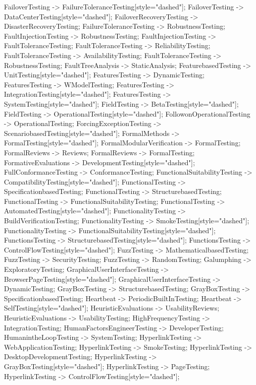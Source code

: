 \documentclass{article}
\begin{document}
{FailoverTesting -> FailureToleranceTesting[style="dashed"];
FailoverTesting -> DataCenterTesting[style="dashed"];
FailoverRecoveryTesting -> DisasterRecoveryTesting;
FailureToleranceTesting -> RobustnessTesting;
FaultInjectionTesting -> RobustnessTesting;
FaultInjectionTesting -> FaultToleranceTesting;
FaultToleranceTesting -> ReliabilityTesting;
FaultToleranceTesting -> AvailabilityTesting;
FaultToleranceTesting -> RobustnessTesting;
FaultTreeAnalysis -> StaticAnalysis;
FeaturebasedTesting -> UnitTesting[style="dashed"];
FeaturesTesting -> DynamicTesting;
FeaturesTesting -> WModelTesting;
FeaturesTesting -> IntegrationTesting[style="dashed"];
FeaturesTesting -> SystemTesting[style="dashed"];
FieldTesting -> BetaTesting[style="dashed"];
FieldTesting -> OperationalTesting[style="dashed"];
FollowonOperationalTesting -> OperationalTesting;
ForcingExceptionTesting -> ScenariobasedTesting[style="dashed"];
FormalMethods -> FormalTesting[style="dashed"];
FormalModularVerification -> FormalTesting;
FormalReviews -> Reviews;
FormalReviews -> FormalTesting;
FormativeEvaluations -> DevelopmentTesting[style="dashed"];
FullConformanceTesting -> ConformanceTesting;
FunctionalSuitabilityTesting -> CompatibilityTesting[style="dashed"];
FunctionalTesting -> SpecificationbasedTesting;
FunctionalTesting -> StructurebasedTesting;
FunctionalTesting -> FunctionalSuitabilityTesting;
FunctionalTesting -> AutomatedTesting[style="dashed"];
FunctionalityTesting -> BuildVerificationTesting;
FunctionalityTesting -> SmokeTesting[style="dashed"];
FunctionalityTesting -> FunctionalSuitabilityTesting[style="dashed"];
FunctionsTesting -> StructurebasedTesting[style="dashed"];
FunctionsTesting -> ControlFlowTesting[style="dashed"];
FuzzTesting -> MathematicalbasedTesting;
FuzzTesting -> SecurityTesting;
FuzzTesting -> RandomTesting;
Galumphing -> ExploratoryTesting;
GraphicalUserInterfaceTesting -> BrowserPageTesting[style="dashed"];
GraphicalUserInterfaceTesting -> DynamicTesting;
GrayBoxTesting -> StructurebasedTesting;
GrayBoxTesting -> SpecificationbasedTesting;
Heartbeat -> PeriodicBuiltInTesting;
Heartbeat -> SelfTesting[style="dashed"];
HeuristicEvaluations -> UsabilityReviews;
HeuristicEvaluations -> UsabilityTesting;
HighFrequencyTesting -> IntegrationTesting;
HumanFactorsEngineerTesting -> DeveloperTesting;
HumanintheLoopTesting -> SystemTesting;
HyperlinkTesting -> WebApplicationTesting;
HyperlinkTesting -> SmokeTesting;
HyperlinkTesting -> DesktopDevelopmentTesting;
HyperlinkTesting -> GrayBoxTesting[style="dashed"];
HyperlinkTesting -> PageTesting;
HyperlinkTesting -> ControlFlowTesting[style="dashed"];
}
\end{document}
